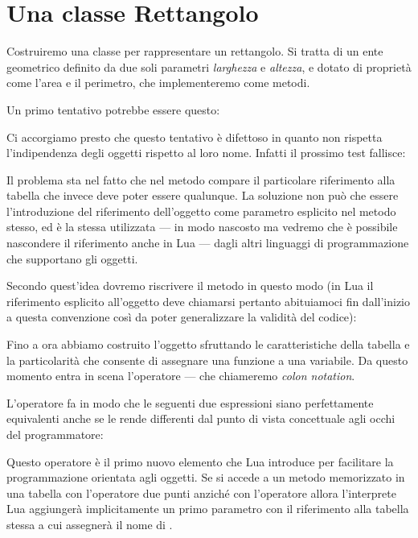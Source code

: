 \section{Una classe Rettangolo}

Costruiremo una classe per rappresentare un rettangolo. Si tratta di un ente
geometrico definito da due soli parametri \emph{larghezza} e \emph{altezza}, e
dotato di proprietà come l'area e il perimetro, che implementeremo come metodi.

Un primo tentativo potrebbe essere questo:

Ci accorgiamo presto che questo tentativo è difettoso in quanto non rispetta
l'indipendenza degli oggetti rispetto al loro nome. Infatti il prossimo test
fallisce:

Il problema sta nel fatto che nel metodo  compare il particolare
riferimento alla tabella  che invece deve poter essere qualunque.
La soluzione non può che essere l'introduzione del riferimento dell'oggetto come
parametro esplicito nel metodo stesso, ed è la stessa utilizzata --- in modo
nascosto ma vedremo che è possibile nascondere il riferimento anche in Lua ---
dagli altri linguaggi di programmazione che supportano gli oggetti.

Secondo quest'idea dovremo riscrivere il metodo  in questo modo (in
Lua il riferimento esplicito all'oggetto deve chiamarsi  pertanto
abituiamoci fin dall'inizio a questa convenzione così da poter generalizzare la
validità del codice):

Fino a ora abbiamo costruito l'oggetto sfruttando le caratteristiche della
tabella e la particolarità che consente di assegnare una funzione a una
variabile. Da questo momento entra in scena l'operatore \key{:} --- che
chiameremo \emph{colon notation}.

L'operatore \key{:} fa in modo che le seguenti due espressioni siano
perfettamente equivalenti anche se le rende differenti dal punto di vista
concettuale agli occhi del programmatore:

Questo operatore è il primo nuovo elemento che Lua introduce per facilitare la
programmazione orientata agli oggetti. Se si accede a un metodo memorizzato in
una tabella con l'operatore due punti \key{:} anziché con l'operatore 
allora l'interprete Lua aggiungerà implicitamente un primo parametro con il
riferimento alla tabella stessa a cui assegnerà il nome di .


